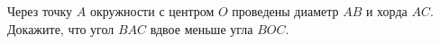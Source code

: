 \begin{ex}
	\begin{condition}
		Через точку \( A  \) окружности с центром \( O  \) проведены диаметр \( AB  \) и хорда \( AC \). Докажите, что угол \( BAC  \) вдвое меньше угла \( BOC \).
	\end{condition}
\end{ex}